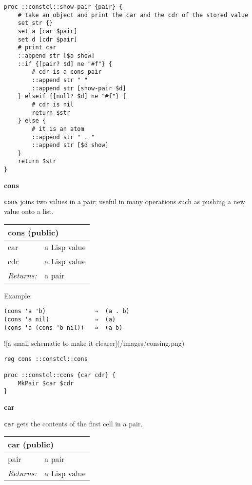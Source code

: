 \documentclass{report}
\begin{document}
\noindent\makebox[\linewidth]{\rule{\linewidth}{0.4pt}}
\begin{lstlisting}
proc ::constcl::show-pair {pair} {
    # take an object and print the car and the cdr of the stored value
    set str {}
    set a [car $pair]
    set d [cdr $pair]
    # print car
    ::append str [$a show]
    ::if {[pair? $d] ne "#f"} {
        # cdr is a cons pair
        ::append str " "
        ::append str [show-pair $d]
    } elseif {[null? $d] ne "#f"} {
        # cdr is nil
        return $str
    } else {
        # it is an atom
        ::append str " . "
        ::append str [$d show]
    }
    return $str
}
\end{lstlisting}
\noindent\makebox[\linewidth]{\rule{\linewidth}{0.4pt}}

\textbf{cons}


\texttt{cons} joins two values in a pair; useful in many operations such as pushing a new value onto a list.

\begin{tabular}{ |l l| }
\hline
\multicolumn{2}{|l|}{cons (public)} \\
\hline
car & a Lisp value \\
cdr & a Lisp value \\
\textit{Returns:} & a pair \\
\hline
\end{tabular}


Example:

\noindent\makebox[\linewidth]{\rule{\linewidth}{0.4pt}}
\begin{lstlisting}
(cons 'a 'b)              ⇒  (a . b)
(cons 'a nil)             ⇒  (a)
(cons 'a (cons 'b nil))   ⇒  (a b)
\end{lstlisting}
\noindent\makebox[\linewidth]{\rule{\linewidth}{0.4pt}}

![a small schematic to make it clearer](/images/consing.png)

\noindent\makebox[\linewidth]{\rule{\linewidth}{0.4pt}}
\begin{lstlisting}
reg cons ::constcl::cons
 
proc ::constcl::cons {car cdr} {
    MkPair $car $cdr
}
\end{lstlisting}
\noindent\makebox[\linewidth]{\rule{\linewidth}{0.4pt}}

\textbf{car}


\texttt{car} gets the contents of the first cell in a pair.

\begin{tabular}{ |l l| }
\hline
\multicolumn{2}{|l|}{car (public)} \\
\hline
pair & a pair \\
\textit{Returns:} & a Lisp value \\
\hline
\end{tabular}
\end{document}
